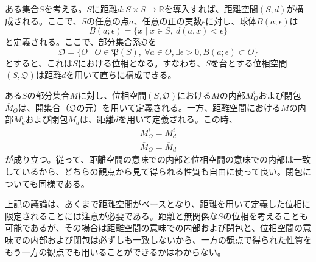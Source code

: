 \documentclass[12pt]{jarticle}
\numberwithin{equation}{section}    %
\numberwithin{figure}{section}      %
\numberwithin{table}{section}      %
\begin{document}
ある集合$S$を考える。$S$に距離$d: S \times S \rightarrow \mathbb{R}$を導入すれば、距離空間$(S, d)$が構成される。ここで、$S$の任意の点$a$、任意の正の実数$\epsilon$に対し、球体$B(a; \epsilon)$は
\begin{equation}
    B(a; \epsilon) = \{x \mid x \in S, ~ d(a, x) < \epsilon\}
\end{equation}
と定義される。ここで、部分集合系$\mathfrak{O}$を
\begin{equation}
    \mathfrak{O} = \{O \mid O \in \mathfrak{P}(S), ~ \forall a \in O, \exists \epsilon > 0, B(a; \epsilon) \subset O\}
\end{equation}
とすると、これは$S$における位相となる。すなわち、$S$を台とする位相空間$(S, \mathfrak{O})$は距離$d$を用いて直ちに構成できる。

ある$S$の部分集合$M$に対し、位相空間$(S, \mathfrak{O})$における$M$の内部$M^{i}_{O}$および閉包$\overline{M}_{O}$は、開集合（$\mathfrak{O}$の元）を用いて定義される。一方、距離空間における$M$の内部$M^{i}_{d}$および閉包$\overline{M}_{d}$は、距離$d$を用いて定義される。この時、
\begin{gather}
    M^{i}_{O} = M^{i}_{d} \\
    \overline{M}_{O} = \overline{M}_{d}
\end{gather}
が成り立つ。従って、距離空間の意味での内部と位相空間の意味での内部は一致しているから、どちらの観点から見て得られる性質も自由に使って良い。閉包についても同様である。

上記の議論は、あくまで距離空間がベースとなり、距離を用いて定義した位相に限定されることには注意が必要である。距離と無関係な$S$の位相を考えることも可能であるが、その場合は距離空間の意味での内部および閉包と、位相空間の意味での内部および閉包は必ずしも一致しないから、一方の観点で得られた性質をもう一方の観点でも用いることができるかはわからない。
\end{document}
